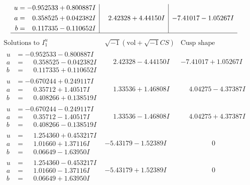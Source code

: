 \documentclass[1p]{elsarticle_modified}
\theoremstyle{definition}
\newcommand{\I}{\sqrt{-1}}
\begin{document}
$$\begin{array}{c|c|c}
\begin{aligned}
u &= -0.952533 + 0.800887 I \\
a &= \phantom{-}0.358525 + 0.042382 I \\
b &= \phantom{-}0.117335 - 0.110652 I\end{aligned}
 & \phantom{-}2.42328 + 4.44150 I & -7.41017 - 1.05267 I\\
 \hline 
 \end{array}$$\newpage$$\begin{array}{c|c|c}  
\text{Solutions to }I^u_{1}& \I (\text{vol} + \sqrt{-1}CS) & \text{Cusp shape}\\
 \hline 
\begin{aligned}
u &= -0.952533 - 0.800887 I \\
a &= \phantom{-}0.358525 - 0.042382 I \\
b &= \phantom{-}0.117335 + 0.110652 I\end{aligned}
 & \phantom{-}2.42328 - 4.44150 I & -7.41017 + 1.05267 I \\ \hline\begin{aligned}
u &= -0.670244 + 0.249117 I \\
a &= \phantom{-}0.35712 + 1.40517 I \\
b &= \phantom{-}0.408266 + 0.138519 I\end{aligned}
 & \phantom{-}1.33536 + 1.46808 I & \phantom{-}4.04275 - 4.37387 I \\ \hline\begin{aligned}
u &= -0.670244 - 0.249117 I \\
a &= \phantom{-}0.35712 - 1.40517 I \\
b &= \phantom{-}0.408266 - 0.138519 I\end{aligned}
 & \phantom{-}1.33536 - 1.46808 I & \phantom{-}4.04275 + 4.37387 I \\ \hline\begin{aligned}
u &= \phantom{-}1.254360 + 0.453217 I \\
a &= \phantom{-}1.01660 + 1.37116 I \\
b &= \phantom{-}0.06649 - 1.63950 I\end{aligned}
 & -5.43179 - 1.52389 I & \phantom{-0.000000 } 0 \\ \hline\begin{aligned}
u &= \phantom{-}1.254360 - 0.453217 I \\
a &= \phantom{-}1.01660 - 1.37116 I \\
b &= \phantom{-}0.06649 + 1.63950 I\end{aligned}
 & -5.43179 + 1.52389 I & \phantom{-0.000000 } 0 \\ \hline\begin{aligned}

\end{aligned}
\end{array}$$
\end{document}

